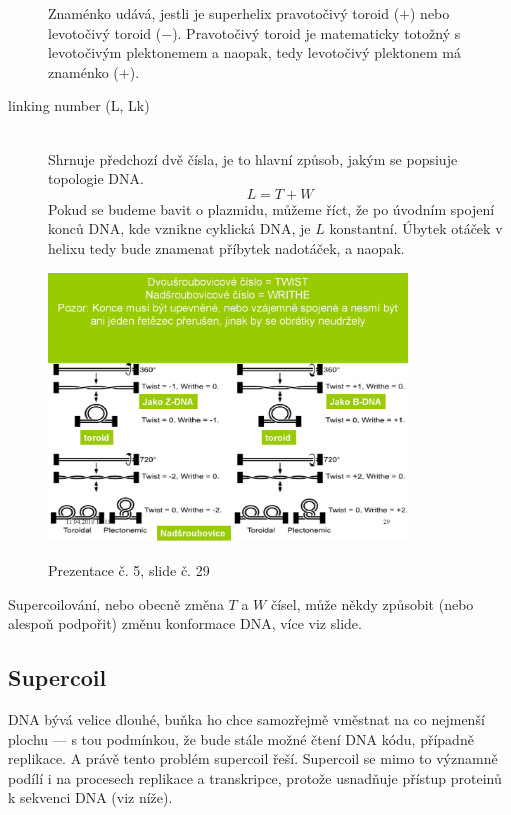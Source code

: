 \documentclass[DIV=8]{scrreprt}
\begin{document}
\begin{description}
Znaménko udává, jestli je superhelix pravotočivý toroid (\(+\)) nebo levotočivý toroid (\(-\)). Pravotočivý toroid je matematicky totožný s levotočivým plektonemem a naopak, tedy levotočivý plektonem má znaménko (\(+\)).


\item[linking number (L, Lk)]\hfill \\
Shrnuje předchozí dvě čísla, je to hlavní způsob, jakým se popsiuje topologie DNA.
\[L = T + W\]
Pokud se budeme bavit o plazmidu, můžeme říct, že po úvodním spojení konců DNA, kde vznikne cyklická DNA, je \(L\) konstantní. Úbytek otáček v helixu tedy bude znamenat příbytek nadotáček, a naopak.


\end{description}


\begin{figure}
    \caption{Prezentace č. 5, slide č. 29}
    \includegraphics[width=0.85\textwidth]{slides-5/slide-29.jpg}
    \centering
    \label{slides-5-slide-29}
\end{figure}
 Supercoilování, nebo obecně změna \(T\) a \(W\) čísel, může někdy způsobit (nebo alespoň podpořit) změnu konformace DNA, více viz slide.

\subsection{Supercoil} \label{Supercoil}


DNA bývá velice dlouhé, buňka ho chce samozřejmě vměstnat na co nejmenší plochu --- s tou podmínkou, že bude stále možné čtení DNA kódu, případně replikace. A právě tento problém supercoil řeší. Supercoil se mimo to významně podílí i na procesech replikace a transkripce, protože usnadňuje přístup proteinů k sekvenci DNA (viz níže).
\end{document}
